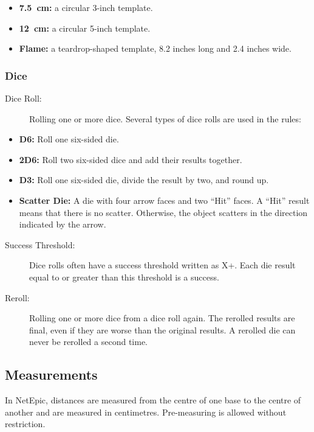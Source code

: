 \begin{itemize}
    \item \textbf{7.5~cm:} a circular 3-inch template.
    \item \textbf{12~cm:} a circular 5-inch template.
    \item \textbf{Flame:} a teardrop-shaped template, 8.2 inches long and 2.4 inches wide.
\end{itemize}

\subsubsection{Dice}

\begin{description}
    \item[Dice Roll:] Rolling one or more dice. Several types of dice rolls are used in the rules:
\end{description}

\begin{itemize}
    \item \textbf{D6:} Roll one six-sided die.
    \item \textbf{2D6:} Roll two six-sided dice and add their results together.
    \item \textbf{D3:} Roll one six-sided die, divide the result by two, and round up.
    \item \textbf{Scatter Die:} A die with four arrow faces and two ``Hit'' faces. A ``Hit'' result means that there is no scatter. Otherwise, the object scatters in the direction indicated by the arrow.
\end{itemize}

\begin{description}
    \item[Success Threshold:] Dice rolls often have a success threshold written as X+. Each die result equal to or greater than this threshold is a success.

    \item[Reroll:] Rolling one or more dice from a dice roll again. The rerolled results are final, even if they are worse than the original results. A rerolled die can never be rerolled a second time.
\end{description}

\subsection{Measurements}

In NetEpic, distances are measured from the centre of one base to the centre of another and are measured in centimetres. Pre-measuring is allowed without restriction.

